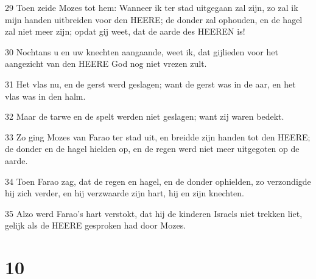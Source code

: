 \par 29 Toen zeide Mozes tot hem: Wanneer ik ter stad uitgegaan zal zijn, zo zal ik mijn handen uitbreiden voor den HEERE; de donder zal ophouden, en de hagel zal niet meer zijn; opdat gij weet, dat de aarde des HEEREN is!
\par 30 Nochtans u en uw knechten aangaande, weet ik, dat gijlieden voor het aangezicht van den HEERE God nog niet vrezen zult.
\par 31 Het vlas nu, en de gerst werd geslagen; want de gerst was in de aar, en het vlas was in den halm.
\par 32 Maar de tarwe en de spelt werden niet geslagen; want zij waren bedekt.
\par 33 Zo ging Mozes van Farao ter stad uit, en breidde zijn handen tot den HEERE; de donder en de hagel hielden op, en de regen werd niet meer uitgegoten op de aarde.
\par 34 Toen Farao zag, dat de regen en hagel, en de donder ophielden, zo verzondigde hij zich verder, en hij verzwaarde zijn hart, hij en zijn knechten.
\par 35 Alzo werd Farao's hart verstokt, dat hij de kinderen Israels niet trekken liet, gelijk als de HEERE gesproken had door Mozes.

\chapter{10}

